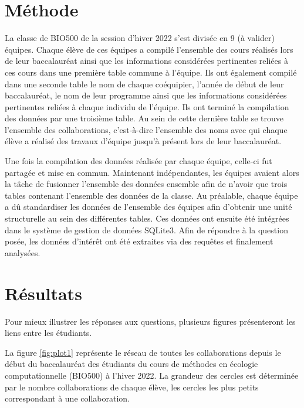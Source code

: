 \documentclass[9pt,twocolumn,twoside,]{pnas-new}
\begin{document}
\hypertarget{muxe9thode}{%
\section{Méthode}\label{muxe9thode}}

La classe de BIO500 de la session d'hiver 2022 s'est divisée en 9 (à
valider) équipes. Chaque élève de ces équipes a compilé l'ensemble des
cours réalisés lors de leur baccalauréat ainsi que les informations
considérées pertinentes reliées à ces cours dans une première table
commune à l'équipe. Ils ont également compilé dans une seconde table le
nom de chaque coéquipier, l'année de début de leur baccalauréat, le nom
de leur programme ainsi que les informations considérées pertinentes
reliées à chaque individu de l'équipe. Ils ont terminé la compilation
des données par une troisième table. Au sein de cette dernière table se
trouve l'ensemble des collaborations, c'est-à-dire l'ensemble des noms
avec qui chaque élève a réalisé des travaux d'équipe jusqu'à présent
lors de leur baccalauréat.

Une fois la compilation des données réalisée par chaque équipe, celle-ci
fut partagée et mise en commun. Maintenant indépendantes, les équipes
avaient alors la tâche de fusionner l'ensemble des données ensemble afin
de n'avoir que trois tables contenant l'ensemble des données de la
classe. Au préalable, chaque équipe a dû standardiser les données de
l'ensemble des équipes afin d'obtenir une unité structurelle au sein des
différentes tables. Ces données ont ensuite été intégrées dans le
système de gestion de données SQLite3. Afin de répondre à la question
posée, les données d'intérêt ont été extraites via des requêtes et
finalement analysées.

\hypertarget{ruxe9sultats}{%
\section{Résultats}\label{ruxe9sultats}}

Pour mieux illustrer les réponses aux questions, plusieurs figures
présenteront les liens entre les étudiants.

La figure \ref{fig:plot1} représente le réseau de toutes les
collaborations depuis le début du baccalauréat des étudiants du cours de
méthodes en écologie computationnelle (BIO500) à l'hiver 2022. La
grandeur des cercles est déterminée par le nombre collaborations de
chaque élève, les cercles les plus petits correspondant à une
collaboration.
\end{document}
